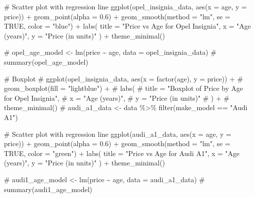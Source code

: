 \documentclass[
  letterpaper,
  DIV=11,
  numbers=noendperiod]{scrartcl}
\newenvironment{Shaded}{\begin{snugshade}}{\end{snugshade}}
\newcommand{\AttributeTok}[1]{\textcolor[rgb]{0.40,0.45,0.13}{#1}}
\newcommand{\CommentTok}[1]{\textcolor[rgb]{0.37,0.37,0.37}{#1}}
\newcommand{\ConstantTok}[1]{\textcolor[rgb]{0.56,0.35,0.01}{#1}}
\newcommand{\FloatTok}[1]{\textcolor[rgb]{0.68,0.00,0.00}{#1}}
\newcommand{\FunctionTok}[1]{\textcolor[rgb]{0.28,0.35,0.67}{#1}}
\newcommand{\NormalTok}[1]{\textcolor[rgb]{0.00,0.23,0.31}{#1}}
\newcommand{\SpecialCharTok}[1]{\textcolor[rgb]{0.37,0.37,0.37}{#1}}
\newcommand{\StringTok}[1]{\textcolor[rgb]{0.13,0.47,0.30}{#1}}
\begin{document}
\begin{Shaded}
\begin{Highlighting}[]
\CommentTok{\# Scatter plot with regression line}
\FunctionTok{ggplot}\NormalTok{(opel\_insignia\_data, }\FunctionTok{aes}\NormalTok{(}\AttributeTok{x =}\NormalTok{ age, }\AttributeTok{y =}\NormalTok{ price)) }\SpecialCharTok{+}
  \FunctionTok{geom\_point}\NormalTok{(}\AttributeTok{alpha =} \FloatTok{0.6}\NormalTok{) }\SpecialCharTok{+}
  \FunctionTok{geom\_smooth}\NormalTok{(}\AttributeTok{method =} \StringTok{"lm"}\NormalTok{, }\AttributeTok{se =} \ConstantTok{TRUE}\NormalTok{, }\AttributeTok{color =} \StringTok{"blue"}\NormalTok{) }\SpecialCharTok{+}
  \FunctionTok{labs}\NormalTok{(}
    \AttributeTok{title =} \StringTok{"Price vs Age for Opel Insignia"}\NormalTok{,}
    \AttributeTok{x =} \StringTok{"Age (years)"}\NormalTok{,}
    \AttributeTok{y =} \StringTok{"Price (in units)"}
\NormalTok{  ) }\SpecialCharTok{+}
  \FunctionTok{theme\_minimal}\NormalTok{()}

\CommentTok{\# opel\_age\_model \textless{}{-} lm(price \textasciitilde{} age, data = opel\_insignia\_data)}
\CommentTok{\# summary(opel\_age\_model)}

\CommentTok{\# Boxplot}
\CommentTok{\# ggplot(opel\_insignia\_data, aes(x = factor(age), y = price)) +}
\CommentTok{\#   geom\_boxplot(fill = "lightblue") +}
\CommentTok{\#   labs(}
\CommentTok{\#     title = "Boxplot of Price by Age for Opel Insignia",}
\CommentTok{\#     x = "Age (years)",}
\CommentTok{\#     y = "Price (in units)"}
\CommentTok{\#   ) +}
\CommentTok{\#   theme\_minimal()}
\CommentTok{\# audi\_a1\_data \textless{}{-} data \%\textgreater{}\% filter(make\_model == "Audi A1")}

\CommentTok{\# Scatter plot with regression line}
\FunctionTok{ggplot}\NormalTok{(audi\_a1\_data, }\FunctionTok{aes}\NormalTok{(}\AttributeTok{x =}\NormalTok{ age, }\AttributeTok{y =}\NormalTok{ price)) }\SpecialCharTok{+}
  \FunctionTok{geom\_point}\NormalTok{(}\AttributeTok{alpha =} \FloatTok{0.6}\NormalTok{) }\SpecialCharTok{+}
  \FunctionTok{geom\_smooth}\NormalTok{(}\AttributeTok{method =} \StringTok{"lm"}\NormalTok{, }\AttributeTok{se =} \ConstantTok{TRUE}\NormalTok{, }\AttributeTok{color =} \StringTok{"green"}\NormalTok{) }\SpecialCharTok{+}
  \FunctionTok{labs}\NormalTok{(}
    \AttributeTok{title =} \StringTok{"Price vs Age for Audi A1"}\NormalTok{,}
    \AttributeTok{x =} \StringTok{"Age (years)"}\NormalTok{,}
    \AttributeTok{y =} \StringTok{"Price (in units)"}
\NormalTok{  ) }\SpecialCharTok{+}
  \FunctionTok{theme\_minimal}\NormalTok{()}

\CommentTok{\# audi1\_age\_model \textless{}{-} lm(price \textasciitilde{} age, data = audi\_a1\_data)}
\CommentTok{\# summary(audi1\_age\_model)}


\end{Highlighting}
\end{Shaded}
\end{document}
